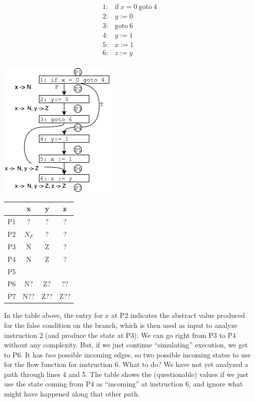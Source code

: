 \documentclass[11pt]{article}
\begin{document}
\begin{center}
\begin{minipage}[t][-9.7em][b]{0.3\textwidth} %
\[
\begin{array}{ll}
1: & \mbox{if}~x=0~\mbox{goto}~4\\
2: & y := 0\\
3: & \mbox{goto}~6\\
4: & y := 1\\
5: & x := 1\\
6: & z := y\\
\end{array}
\]
\end{minipage}
\includegraphics[scale=0.75]{images/df-notes-if1}
\begin{minipage}[t][-9.7em][b]{0.30\textwidth} %
\begin{tabular}{r | c c c}
  & x & y & z \\
\midrule
P1 & ?  & ?  & ? \\
P2 & $N_F$ & ? & ?  \\
P3 & N & Z & ?  \\
P4 & N & Z & ? \\
P5 &   &   &  \\
P6 & N?  & Z?   & ??  \\
P7 & N?? & Z?? & Z?? \\
\end{tabular}
\end{minipage}
\end{center}

In the table above, the entry for $x$ at P2 indicates the abstract value
produced for the false condition on the branch, which is then used as input to
analyze instruction 2 (and produce the state at P3). We can go right from P3 to
P4 without any complexity.
%
But, if we just continue ``simulating'' execution, we get to P6.  It has \emph{two}
possible incoming edges, so two possible incoming states to use for the flow
function for instruction 6.  What to do?
We have not yet analyzed a path through lines 4 and 5.  The table shows the
(questionable) values if we just use the state coming from P4 as ``incoming'' at
instruction 6, and ignore what might have happened along that other path. 
\end{document}
